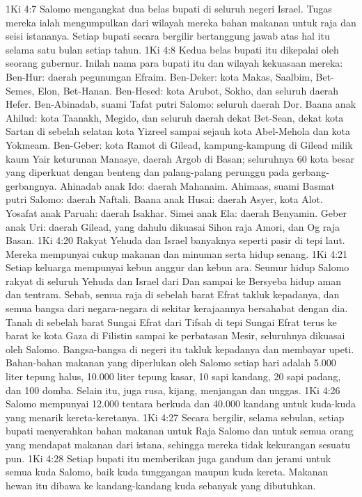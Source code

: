 1Ki 4:7  Salomo mengangkat dua belas bupati di seluruh negeri Israel. Tugas mereka ialah mengumpulkan dari wilayah mereka bahan makanan untuk raja dan seisi istananya. Setiap bupati secara bergilir bertanggung jawab atas hal itu selama satu bulan setiap tahun.
1Ki 4:8  Kedua belas bupati itu dikepalai oleh seorang gubernur. Inilah nama para bupati itu dan wilayah kekuasaan mereka: Ben-Hur: daerah pegunungan Efraim. Ben-Deker: kota Makas, Saalbim, Bet-Semes, Elon, Bet-Hanan. Ben-Hesed: kota Arubot, Sokho, dan seluruh daerah Hefer. Ben-Abinadab, suami Tafat putri Salomo: seluruh daerah Dor. Baana anak Ahilud: kota Taanakh, Megido, dan seluruh daerah dekat Bet-Sean, dekat kota Sartan di sebelah selatan kota Yizreel sampai sejauh kota Abel-Mehola dan kota Yokmeam. Ben-Geber: kota Ramot di Gilead, kampung-kampung di Gilead milik kaum Yair keturunan Manasye, daerah Argob di Basan; seluruhnya 60 kota besar yang diperkuat dengan benteng dan palang-palang perunggu pada gerbang-gerbangnya. Ahinadab anak Ido: daerah Mahanaim. Ahimaas, suami Basmat putri Salomo: daerah Naftali. Baana anak Husai: daerah Asyer, kota Alot. Yosafat anak Paruah: daerah Isakhar. Simei anak Ela: daerah Benyamin. Geber anak Uri: daerah Gilead, yang dahulu dikuasai Sihon raja Amori, dan Og raja Basan.
1Ki 4:20  Rakyat Yehuda dan Israel banyaknya seperti pasir di tepi laut. Mereka mempunyai cukup makanan dan minuman serta hidup senang.
1Ki 4:21  Setiap keluarga mempunyai kebun anggur dan kebun ara. Seumur hidup Salomo rakyat di seluruh Yehuda dan Israel dari Dan sampai ke Bersyeba hidup aman dan tentram. Sebab, semua raja di sebelah barat Efrat takluk kepadanya, dan semua bangsa dari negara-negara di sekitar kerajaannya bersahabat dengan dia. Tanah di sebelah barat Sungai Efrat dari Tifsah di tepi Sungai Efrat terus ke barat ke kota Gaza di Filistin sampai ke perbatasan Mesir, seluruhnya dikuasai oleh Salomo. Bangsa-bangsa di negeri itu takluk kepadanya dan membayar upeti. Bahan-bahan makanan yang diperlukan oleh Salomo setiap hari adalah 5.000 liter tepung halus, 10.000 liter tepung kasar, 10 sapi kandang, 20 sapi padang, dan 100 domba. Selain itu, juga rusa, kijang, menjangan dan unggas.
1Ki 4:26  Salomo mempunyai 12.000 tentara berkuda dan 40.000 kandang untuk kuda-kuda yang menarik kereta-keretanya.
1Ki 4:27  Secara bergilir, selama sebulan, setiap bupati menyerahkan bahan makanan untuk Raja Salomo dan untuk semua orang yang mendapat makanan dari istana, sehingga mereka tidak kekurangan sesuatu pun.
1Ki 4:28  Setiap bupati itu memberikan juga gandum dan jerami untuk semua kuda Salomo, baik kuda tunggangan maupun kuda kereta. Makanan hewan itu dibawa ke kandang-kandang kuda sebanyak yang dibutuhkan.
